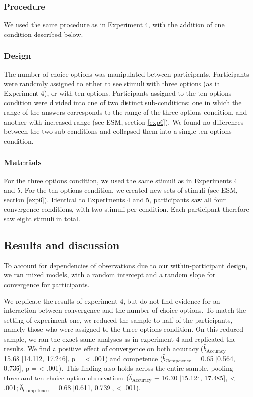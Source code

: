 \documentclass[
  doc,floatsintext]{apa6}
\begin{document}
\subsubsection{Procedure}\label{procedure-4}

We used the same procedure as in Experiment 4, with the addition of one condition described below.

\subsubsection{Design}\label{design-5}

The number of choice options was manipulated between participants. Participants were randomly assigned to either to see stimuli with three options (as in Experiment 4), or with ten options. Participants assigned to the ten options condition were divided into one of two distinct sub-conditions: one in which the range of the answers corresponds to the range of the three options condition, and another with increased range (see ESM, section \ref{exp6}). We found no differences between the two sub-conditions and collapsed them into a single ten options condition.

\subsubsection{Materials}\label{materials-5}

For the three options condition, we used the same stimuli as in Experiments 4 and 5. For the ten options condition, we created new sets of stimuli (see ESM, section \ref{exp6}). Identical to Experiments 4 and 5, participants saw all four convergence conditions, with two stimuli per condition. Each participant therefore saw eight stimuli in total.

\subsection{Results and discussion}\label{results-and-discussion-5}

To account for dependencies of observations due to our within-participant design, we ran mixed models, with a random intercept and a random slope for convergence for participants.

We replicate the results of experiment 4, but do not find evidence for an interaction between convergence and the number of choice options. To match the setting of experiment one, we reduced the sample to half of the participants, namely those who were assigned to the three options condition. On this reduced sample, we ran the exact same analyses as in experiment 4 and replicated the results. We find a positive effect of convergence on both accuracy (\(\hat{b}_{\text{Accuracy}}\) = 15.68 {[}14.112, 17.246{]}, p = \textless{} .001) and competence (\(\hat{b}_{\text{Competence}}\) = 0.65 {[}0.564, 0.736{]}, p = \textless{} .001). This finding also holds across the entire sample, pooling three and ten choice option observations (\(\hat{b}_{\text{Accuracy}}\) = 16.30 {[}15.124, 17.485{]}, \textless{} .001; \(\hat{b}_{\text{Competence}}\) = 0.68 {[}0.611, 0.739{]}, \textless{} .001).
\end{document}
